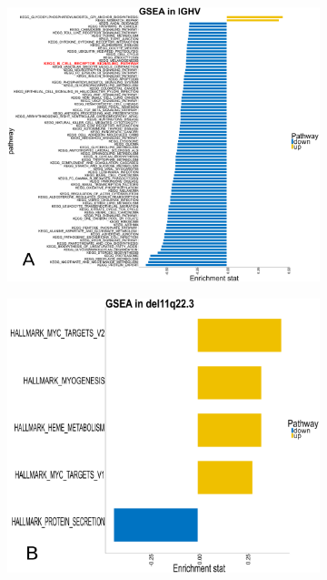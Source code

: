\begin{figure}
	\centering
	\begin{subfigure}[t]{0.59\columnwidth}
		\includegraphics[width=\columnwidth]{./Figures/gseaKegg_IGHV.pdf}
		\subcaption*{}
		\label{fig:gseaKegg_IGHV}
	\end{subfigure}
	\quad
	\begin{subfigure}[t]{0.33\columnwidth}
		\includegraphics[width=\columnwidth]{./Figures/gseaHallmark_del11.pdf}

\end{subfigure}
\end{figure}

